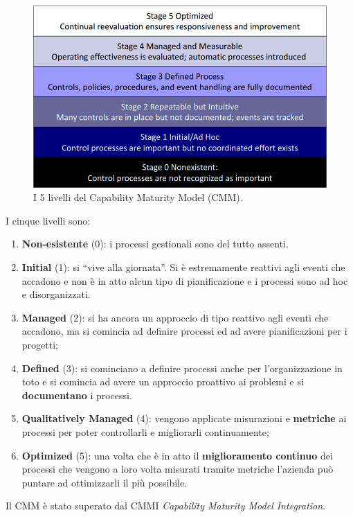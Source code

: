 \begin{figure}[h!]
        \begin{center}
                \includegraphics[scale=2.0]{res/img/maturity_level}
        \end{center}
        \caption{I 5 livelli del Capability Maturity Model (CMM).}
        \label{fig:cmm:levels}
\end{figure}



I cinque livelli sono:
\begin{enumerate}
  \item \textbf{Non-esistente} (0): i processi gestionali sono del tutto
  assenti.
  \item \textbf{Initial} (1): si ``vive alla giornata''. Si è estremamente
  reattivi agli eventi che accadono e non è in atto alcun tipo di
  pianificazione e i processi sono ad hoc e disorganizzati.
  \item \textbf{Managed} (2): si ha ancora un approccio di tipo reattivo agli
  eventi che accadono, ma si comincia ad definire processi ed ad avere
  pianificazioni per i progetti;
  \item \textbf{Defined} (3): si cominciano a definire processi anche per
  l'organizzazione in toto e si comincia ad avere un approccio proattivo ai
  problemi e si \textbf{documentano} i processi.
  \item \textbf{Qualitatively Managed} (4): vengono applicate misurazioni e
  \textbf{metriche} ai processi per poter controllarli e migliorarli continuamente;
  \item \textbf{Optimized} (5): una volta che è in atto il \textbf{miglioramento continuo}
  dei processi che vengono a loro volta misurati tramite metriche l'azienda
  può puntare ad ottimizzarli il più possibile.
\end{enumerate}
Il CMM è stato superato dal CMMI \textit{Capability Maturity Model Integration}.



